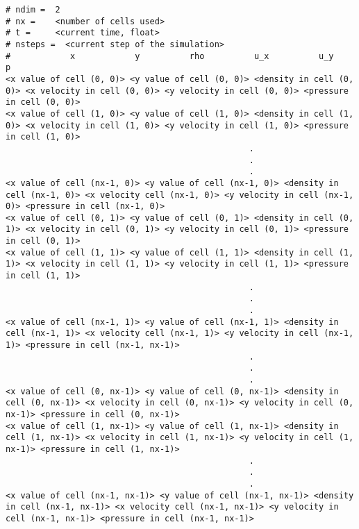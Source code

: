 \begin{lstlisting}
# ndim =  2
# nx =    <number of cells used>
# t =     <current time, float>
# nsteps =  <current step of the simulation>
#            x            y          rho          u_x          u_y            p
<x value of cell (0, 0)> <y value of cell (0, 0)> <density in cell (0, 0)> <x velocity in cell (0, 0)> <y velocity in cell (0, 0)> <pressure in cell (0, 0)>
<x value of cell (1, 0)> <y value of cell (1, 0)> <density in cell (1, 0)> <x velocity in cell (1, 0)> <y velocity in cell (1, 0)> <pressure in cell (1, 0)>
                                                 .
                                                 .
                                                 .
<x value of cell (nx-1, 0)> <y value of cell (nx-1, 0)> <density in cell (nx-1, 0)> <x velocity cell (nx-1, 0)> <y velocity in cell (nx-1, 0)> <pressure in cell (nx-1, 0)>
<x value of cell (0, 1)> <y value of cell (0, 1)> <density in cell (0, 1)> <x velocity in cell (0, 1)> <y velocity in cell (0, 1)> <pressure in cell (0, 1)>
<x value of cell (1, 1)> <y value of cell (1, 1)> <density in cell (1, 1)> <x velocity in cell (1, 1)> <y velocity in cell (1, 1)> <pressure in cell (1, 1)>
                                                 .
                                                 .
                                                 .
<x value of cell (nx-1, 1)> <y value of cell (nx-1, 1)> <density in cell (nx-1, 1)> <x velocity cell (nx-1, 1)> <y velocity in cell (nx-1, 1)> <pressure in cell (nx-1, nx-1)>
                                                 .
                                                 .
                                                 .
<x value of cell (0, nx-1)> <y value of cell (0, nx-1)> <density in cell (0, nx-1)> <x velocity in cell (0, nx-1)> <y velocity in cell (0, nx-1)> <pressure in cell (0, nx-1)>
<x value of cell (1, nx-1)> <y value of cell (1, nx-1)> <density in cell (1, nx-1)> <x velocity in cell (1, nx-1)> <y velocity in cell (1, nx-1)> <pressure in cell (1, nx-1)>
                                                 .
                                                 .
                                                 .
<x value of cell (nx-1, nx-1)> <y value of cell (nx-1, nx-1)> <density in cell (nx-1, nx-1)> <x velocity cell (nx-1, nx-1)> <y velocity in cell (nx-1, nx-1)> <pressure in cell (nx-1, nx-1)>
\end{lstlisting}


